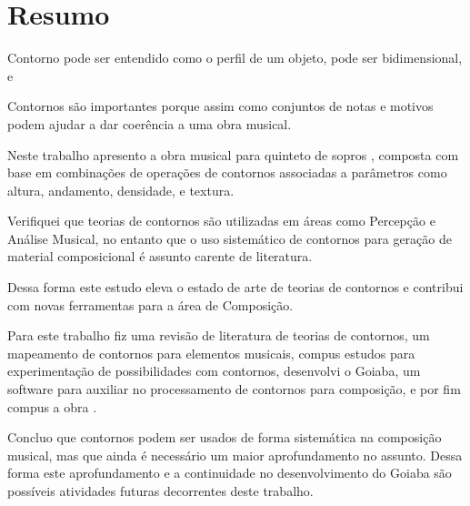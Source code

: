 \chapter*{Resumo}
\label{cha:resumo}


Contorno pode ser entendido como o perfil de um objeto, pode ser
bidimensional, e


Contornos são importantes porque assim como conjuntos de notas e
motivos podem ajudar a dar coerência a uma obra musical.


Neste trabalho apresento a obra musical para quinteto de sopros
\obra{}, composta com base em combinações de operações de contornos
associadas a parâmetros como altura, andamento, densidade, e
textura.


Verifiquei que teorias de contornos são utilizadas em áreas como
Percepção e Análise Musical, no entanto que o uso sistemático de
contornos para geração de material composicional é assunto carente de
literatura.

Dessa forma este estudo eleva o estado de arte de teorias de contornos
e contribui com novas ferramentas para a área de Composição.


Para este trabalho fiz uma revisão de literatura de teorias de
contornos, um mapeamento de contornos para elementos musicais, compus
estudos para experimentação de possibilidades com contornos,
desenvolvi o Goiaba, um software para auxiliar no processamento de
contornos para composição, e por fim compus a obra \obra{}.


Concluo que contornos podem ser usados de forma sistemática na
composição musical, mas que ainda é necessário um maior aprofundamento
no assunto. Dessa forma este aprofundamento e a continuidade no
desenvolvimento do Goiaba são possíveis atividades futuras decorrentes
deste trabalho.
